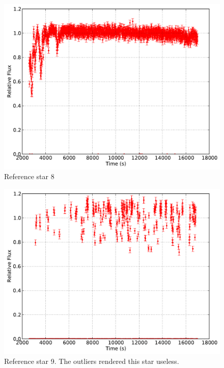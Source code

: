 \documentclass{aastex61}
\begin{document}
\begin{figure}[h]
	\centering
	\includegraphics[scale = .30]{exo_curves8.pdf}
	\caption{Reference star 8}
	\label{fig: refcurve8}
\end{figure}
\begin{figure}[h]
	\centering
	\includegraphics[scale = .30]{exo_curves9.pdf}
	\caption{Reference star 9. The outliers rendered this star useless.}
	\label{fig: refcurve9}
\end{figure}
\end{document}
